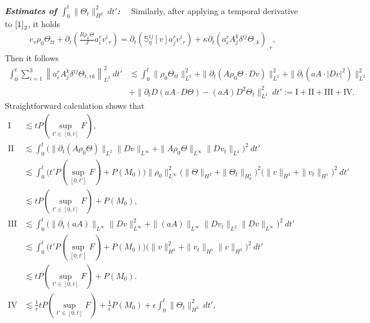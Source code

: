 \documentclass[12pt,a4paper]{amsart}
\numberwithin{equation}{section}
\theoremstyle{plain}
\theoremstyle{definition}
\begin{document}
\textsl{\textbf{Estimates of $\int_{0}^{t}\| \Theta_t\|_{H^2}^2\ dt'$:}}~~
Similarly, after applying a temporal derivative to $\eqref{1}_2$, it holds
\begin{align*}
c_v\rho_0 \Theta_{tt}+\partial_t \left( \frac{R\rho_0\Theta}{J}a^r_iv^i_{,r}\right)=\partial_t(\mathbb{S}_{\eta}^{ij}[v]a^r_jv^i_{,r})+\kappa \partial_t (a^r_i A^k_j \delta^{ij}\Theta_{,k})_{,r},
\end{align*}
Then it follows
\begin{align*}
\int_{0}^{t}\sum\limits_{i=1}^3\left\|a^r_i A^k_j \delta^{ij}\Theta_{t,rk} \right\|_{L^2}^2 \ dt'
&\lesssim \int_{0}^{t} \|\rho_0 \Theta_{tt}\|_{L^2}^2
   +\| \partial_t (A\rho_0\Theta\cdot Dv)\|_{L^2}^2
   +\| \partial_t (a A \cdot |Dv|^2)\|_{L^2}^2\\
& +\|\partial_t D(aA\cdot D\Theta)-(aA) D^2 \Theta_t\|_{L^2}^2\ dt'
:=\mathrm{I}+\mathrm{II}+\mathrm{III} +\mathrm{IV}.
\end{align*}
Straightforward calculation shows that
\begin{align*}
\mathrm{I}&\lesssim tP(\sup\limits_{t'\in[0,t]}F),\\
\mathrm{II}&\lesssim \int_{0}^{t} \Big(\|\partial_t(A\rho_0\Theta)\|_{L^2}\|Dv\|_{L^{\infty}}+\|A\rho_0\Theta\|_{L^{\infty}}\|Dv_t\|_{L^2}\Big)^2\ dt' \\
&\lesssim \int_{0}^{t} \Big( t'P(\sup\limits_{[0,t']}F)+P(M_0)  \Big)\|\rho_0\|_{L^{\infty}}^2
\Big(\|\Theta\|_{H^3}+\|\Theta_t\|_{H_0^1}\Big)^2
\Big(\|v\|_{H^3}+\|v_t\|_{H^1}\Big)^2 \ dt'\\
&\lesssim tP(\sup\limits_{t'\in[0,t]}F)+P(M_0),\\
\mathrm{III}&\lesssim \int_{0}^{t}  \Big(\|\partial_t (aA)\|_{L^{\infty}}\|Dv\|_{L^{\infty}}^2
+\|(aA)\|_{L^{\infty}}\|D v_t\|_{L^2}\|Dv\|_{L^{\infty}}
\Big)^2 \ dt'\\
&\lesssim \int_{0}^{t} \Big( t'P(\sup\limits_{[0,t']}F)+P(M_0)  \Big)
\Big(\|v\|_{H^3}^2+\|v_t\|_{H^1}\|v\|_{H^3}\Big)^2 \ dt'\\
&\lesssim tP(\sup\limits_{t'\in[0,t]}F)+P(M_0).\\
\mathrm{IV}
&\lesssim \frac{1}{\epsilon}tP(\sup\limits_{t'\in[0,t]}F)+\frac{1}{\epsilon}P(M_0)+\epsilon \int_{0}^{t}\| \Theta_t \|_{H^2}^2\ dt',\\
\end{align*}
\end{document}
